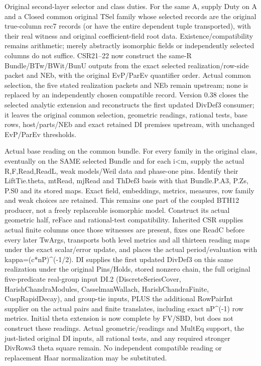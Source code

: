 \begin{description}[style=nextline]
\item[30. SECOND\_LAYER\_COMPATIBLE\_SELECTION --- C] Original second-layer selector and class duties. For the same A, supply Duty on A and a Closed common original TSel family whose selected records are the original true-column rec7 records (or have the entire dependent tuple transported), with their real witness and original coefficient-field root data. Existence/\allowbreak{}compatibility remains arithmetic; merely abstractly isomorphic fields or independently selected columns do not suffice. CSR21–22 now construct the same-R Bundle/\allowbreak{}BTw/\allowbreak{}BWit/\allowbreak{}BunU outputs from the exact selected realization/\allowbreak{}row-side packet and NEb, with the original EvP/\allowbreak{}ParEv quantifier order. Actual common selection, the five stated realization packets and NEb remain upstream; none is replaced by an independently chosen compatible record. Version 0.38 closes the selected analytic extension and reconstructs the first updated DivDef3 consumer; it leaves the original common selection, geometric readings, rational tests, base rows, host/\allowbreak{}parts/\allowbreak{}NEb and exact retained DI premises upstream, with unchanged EvP/\allowbreak{}ParEv thresholds.

\item[31. BASE\_THETA\_READINGS --- C] Actual base reading on the common bundle. For every family in the original class, eventually on the SAME selected Bundle and for each i<m, supply the actual R,F,Read,ReadL, weak models/\allowbreak{}Weil data and phase-one pins. Identify their LiftTie.theta, mtRead, mjRead and ThDef3 basis with that Bundle.P.A3, P.Zs, P.S0 and its stored maps. Exact field, embeddings, metrics, measures, row family and weak choices are retained. This remains one part of the coupled BTH12 producer, not a freely replaceable isomorphic model. Construct its actual geometric half, reFace and rational-test compatibility. Inherited CSR supplies actual finite columns once those witnesses are present, fixes one ReadC before every later TwArgs, transports both level metrics and all thirteen reading maps under the exact scalar/\allowbreak{}error update, and places the actual period/\allowbreak{}evaluation with kappa=(c*nP)\textasciicircum{}(-1/\allowbreak{}2). DI supplies the first updated DivDef3 on this same realization under the original Pins/\allowbreak{}Holds, stored nonzero chain, the full original five-predicate real-group input DI.2 (DiscreteSeriesCover, HarishChandraModules, CasselmanWallach, HarishChandraFinite, CuspRapidDecay), and group-tie inputs, PLUS the additional RowPairInt supplier on the actual pairs and finite translates, including exact nP\textasciicircum{}(-1) row metrics. Initial theta extension is now complete by FV/\allowbreak{}SBD, but does not construct these readings. Actual geometric/\allowbreak{}readings and MultEq support, the just-listed original DI inputs, all rational tests, and any required stronger DivRows3 theta square remain. No independent compatible reading or replacement Haar normalization may be substituted.


\end{description}
